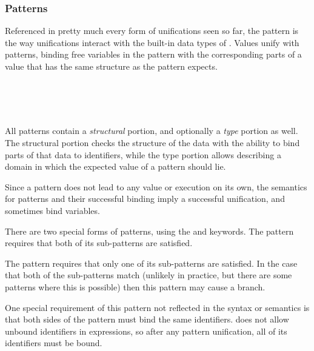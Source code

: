 \subsubsection{Patterns}
\label{sec:patterns}

Referenced in pretty much every form of unifications seen so far, the pattern is
the way unifications interact with the built-in data types of \Trilogy{}. Values
unify with patterns, binding free variables in the pattern with the corresponding
parts of a value that has the same structure as the pattern expects.

\begin{bnf*}
     \\
     \\
     \\
\end{bnf*}

All patterns contain a \emph{structural} portion, and optionally a \emph{type}
portion as well. The structural portion checks the structure of the data with
the ability to bind parts of that data to identifiers, while the type portion
allows describing a domain in which the expected value of a pattern should lie.

Since a pattern does not lead to any value or execution on its own, the semantics for
patterns and their successful binding imply a successful unification, and sometimes
bind variables.

There are two special forms of patterns, using the  and  keywords.
The  pattern requires that both of its sub-patterns are satisfied.

\begin{prooftree}
\end{prooftree}

The  pattern requires that only one of its sub-patterns are satisfied.
In the case that both of the sub-patterns match (unlikely in practice, but there are
some patterns where this is possible) then this pattern may cause a branch.

One special requirement of this pattern not reflected in the syntax or
semantics is that both sides of the  pattern must bind the same
identifiers. \Trilogy{} does not allow unbound identifiers in expressions,
so after any pattern unification, all of its identifiers must be bound.


